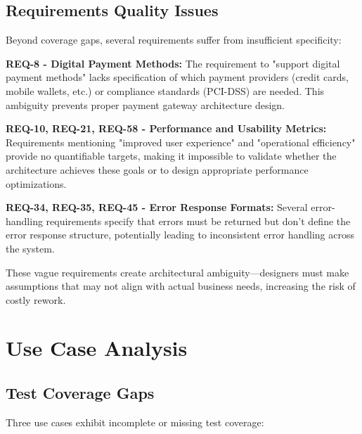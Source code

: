 \documentclass[11pt,a4paper]{article}
\begin{document}
\subsection{Requirements Quality Issues}
\label{sec:req-quality}

Beyond coverage gaps, several requirements suffer from insufficient specificity:

\begin{tcolorbox}[colback=warningorange!5,colframe=warningorange,title=\textbf{Vague Requirements Impacting Design}]
\textbf{\label{req:payment-methods}REQ-8 - Digital Payment Methods:} The requirement to "support digital payment methods" lacks specification of which payment providers (credit cards, mobile wallets, etc.) or compliance standards (PCI-DSS) are needed. This ambiguity prevents proper payment gateway architecture design.

\textbf{\label{req:performance-metrics}REQ-10, REQ-21, REQ-58 - Performance and Usability Metrics:} Requirements mentioning "improved user experience" and "operational efficiency" provide no quantifiable targets, making it impossible to validate whether the architecture achieves these goals or to design appropriate performance optimizations.

\textbf{\label{req:error-formats}REQ-34, REQ-35, REQ-45 - Error Response Formats:} Several error-handling requirements specify that errors must be returned but don't define the error response structure, potentially leading to inconsistent error handling across the system.
\end{tcolorbox}

These vague requirements create architectural ambiguity—designers must make assumptions that may not align with actual business needs, increasing the risk of costly rework.

\section{Use Case Analysis}

\subsection{Test Coverage Gaps}
\label{sec:uc-gaps}

Three use cases exhibit incomplete or missing test coverage:
\end{document}
